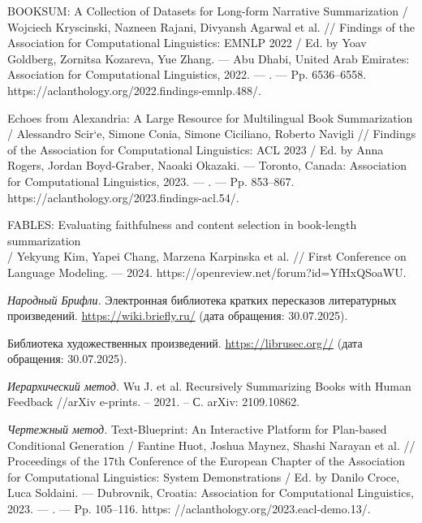 \documentclass{article}
\begin{document}
\begin{thebibliography}{99}
BOOKSUM: A Collection of Datasets for Long-form Narrative Summarization / Wojciech Kryscinski, Nazneen Rajani, Divyansh Agarwal et al. // Findings of the Association for Computational Linguistics: EMNLP 2022 / Ed. by Yoav Goldberg, Zornitsa Kozareva, Yue Zhang. — Abu Dhabi, United Arab Emirates: Association for Computational Linguistics, 2022. — . — Pp. 6536–6558. https://aclanthology.org/2022.findings-emnlp.488/.

Echoes from Alexandria: A Large Resource for Multilingual Book Summarization / Alessandro Scir`e, Simone Conia, Simone Ciciliano, Roberto Navigli // Findings of the Association for Computational Linguistics: ACL 2023 / Ed. by Anna Rogers, Jordan Boyd-Graber, Naoaki Okazaki. — Toronto, Canada: Association for Computational Linguistics, 2023. — . — Pp. 853–867. https://aclanthology.org/2023.findings-acl.54/.

FABLES: Evaluating faithfulness and content selection in book-length summarization \\/ Yekyung Kim, Yapei Chang, Marzena Karpinska et al. // First Conference on Language Modeling. — 2024. https://openreview.net/forum?id=YfHxQSoaWU.

\textit{Народный Брифли.}  
Электронная библиотека кратких пересказов литературных произведений.  
\url{https://wiki.briefly.ru/} (дата обращения: 30.07.2025).

Библиотека художественных произведений.  
\url{https://librusec.org//} (дата обращения: 30.07.2025).

\textit{Иерархический метод.}  
Wu J. et al. Recursively Summarizing Books with Human Feedback //arXiv e-prints. – 2021. – С. arXiv: 2109.10862.

\textit{Чертежный метод.}  
Text-Blueprint: An Interactive Platform for Plan-based Conditional Generation / Fantine Huot, Joshua Maynez, Shashi Narayan et al. // Proceedings of the 17th Conference of the European Chapter of the Association for Computational Linguistics:
System Demonstrations / Ed. by Danilo Croce, Luca Soldaini. — Dubrovnik, Croatia: Association for Computational Linguistics, 2023. — . — Pp. 105–116. https:
//aclanthology.org/2023.eacl-demo.13/.



\end{thebibliography}
\end{document}
